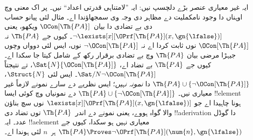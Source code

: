 \documentclass[../../../include/open-logic-section]{subfiles}
\begin{document}
ایہ غیر معیاری عنصر بڑے دلچسپ نیں: ایہ ”لامتناہی
قدرتی اعداد“ نیں۔ پر اک معنی وچ اوہناں دا وجود
نامکملیت دے مظاہر دی وجہ وی سمجھاؤندا اے۔ مثال لئی
پیانو حساب دی بے تضادی دا بیان~$\OCon[\Th{PA}]$
ویکھو، یعنی $\lnot
\lexists[x][\OPrf[\Th{PA}](x, \gn{\lfalse})]$۔
کیوں جے $\Th{PA}$ نہ $\OCon[\Th{PA}]$ نوں ثابت کردا اے
نہ $\lnot \OCon[\Th{PA}]$ نوں، ایس لئی دوواں وچوں
جیہڑا مرضی بیان $\Th{PA}$ وچ بے تضادی برقرار رکھ کے
شامل کیتا جا سکدا اے۔ کیوں جے $\Th{PA}$ بے تضاد اے،
$\Sat{N}{\OCon[\Th{PA}]}$، تے نتیجتاً
$\Sat/{N}{\lnot
  \OCon[\Th{PA}]}$۔ ایس لئی $\Struct{N}$،
$\Th{PA} \cup \{\lnot \OCon[\Th{PA}]\}$ دا
\emph{نمونہ نہیں}؛ ایس نظریے دے سارے نمونے لازماً
غیر معیاری نیں۔ $\Th{PA} \cup \{\lnot \OCon[\Th{PA}]\}$
دے نمونیاں وچ کوئی ایسا !!{element} ہونا چاہیدا اے
جو $\lexists[x][\OPrf[\Th{PA}](x, \gn{\lfalse})]$
نوں سچ بناؤن والا گواہ ہووے، یعنی نمونے دے اندر~$\Th{PA}$ توں
تضاد دی !!a{derivation} دا گوڈل عدد۔
ایہ !!a{element} معیاری نہیں ہو سکدا، کیوں جے
$\Th{PA} \Proves \lnot
\OPrf[\Th{PA}](\num{n}, \gn{\lfalse})$
ہر~$n$ لئی ہوندا اے۔
\end{document}
